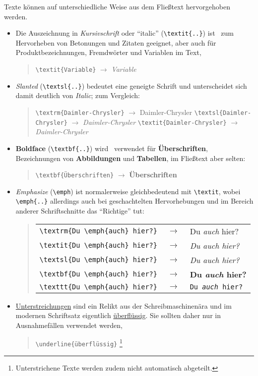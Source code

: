 Texte können auf unterschiedliche Weise aus dem Fließtext hervorgehoben werden.
\begin{itemize}
%
\item Die Auszeichnung in \textit{Kursivschrift} oder "`italic"' (\verb!\textit{..}!) ist \va\ zum Hervorheben von
Betonungen und Zitaten geeignet, aber auch für
Produktbezeichnungen, Fremdwörter und Variablen im Text, \zB
%
\begin{quote}
\verb!\textit{Variable}! $\rightarrow$ \textit{Variable}
\end{quote}
%
\item {\sl Slanted} %
(\verb!\textsl{..}!) bedeutet eine geneigte Schrift und
unterscheidet sich damit deutlich von \textit{Italic}; 
zum Vergleich:
%
\begin{quote}
\verb!\textrm{Daimler-Chrysler}! $\rightarrow$ \textrm{Daimler-Chrysler} \newline%
\verb!\textsl{Daimler-Chrysler}! $\rightarrow$ \textsl{Daimler-Chrysler} \newline%
\verb!\textit{Daimler-Chrysler}! $\rightarrow$ \textit{Daimler-Chrysler}
\end{quote}
%
\item \textbf{Boldface} (\verb!\textbf{..}!) wird \ia\ verwendet für 
\textbf{Überschriften}, Bezeichnungen von \textbf{Abbildungen} und 
\textbf{Tabellen}, im Fließtext aber selten:
%
\begin{quote}
\verb!\textbf{Überschriften}! $\rightarrow$ \textbf{Überschriften}
\end{quote}
%
\item \emph{Emphasize} (\verb!\emph!) %
ist normalerweise gleichbedeutend mit \verb!\textit!, wobei
\verb!\emph{..}! allerdings auch bei geschachtelten
Hervorhebungen und im Bereich anderer Schriftschnitte das
"`Richtige"' tut: 
%
\begin{quote}
\setlength{\tabcolsep}{0pt}%
\begin{tabular}{lcl}
\verb!\textrm{Du \emph{auch} hier?}! & $\;\rightarrow\;$ &
    \textrm{Du \emph{auch} hier?}
\\
\verb!\textit{Du \emph{auch} hier?}! & $\;\rightarrow\;$ &
    \textit{Du \emph{auch} hier?} 
\\
\verb!\textsl{Du \emph{auch} hier?}! & $\;\rightarrow\;$ & 
    \textsl{Du \emph{auch} hier?}
\\
\verb!\textbf{Du \emph{auch} hier?}! & $\;\rightarrow\;$ & 
    \textbf{Du \emph{auch} hier?}
\\
\verb!\texttt{Du \emph{auch} hier?}! & $\;\rightarrow\;$ & 
    \texttt{Du \emph{auch} hier?}
\end{tabular}
\end{quote}
%
\item \underline{Unterstreichungen} sind ein Relikt aus der 
Schreibmaschinenära und im modernen Schriftsatz
eigentlich \underline{überflüssig}. Sie sollten daher nur in
Ausnahmefällen verwendet werden, \zB
%
\begin{quote}
\verb!\underline{überflüssig}!%
\footnote{Unterstrichene Texte werden zudem nicht automatisch abgeteilt.}
\end{quote}
%
\end{itemize}



